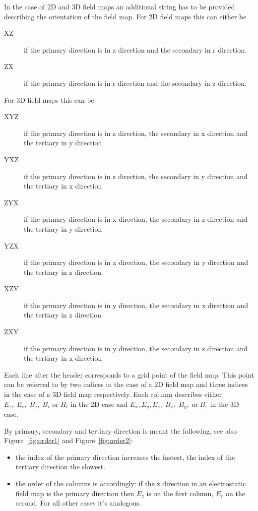 In the case of 2D and 3D field maps an additional string has to be provided describing the orientation of the field map. For 2D field maps this can either be 
\begin{description}
\item[XZ]
if the primary direction is in z direction and the secondary in r direction.
\item[ZX]
if the primary direction is in r direction and the secondary in z direction.
\end{description}
For 3D field maps this can be
\begin{description}
\item[XYZ]
if the primary direction is in z direction, the secondary in x direction and the tertiary in y direction
\item[YXZ]
if the primary direction is in z direction, the secondary in y direction and the tertiary in x direction
\item[ZYX]
if the primary direction is in x direction, the secondary in z direction and the tertiary in y direction
\item[YZX]
if the primary direction is in x direction, the secondary in y direction and the tertiary in z direction
\item[XZY]
if the primary direction is in y direction, the secondary in x direction and the tertiary in z direction
\item[ZXY]
if the primary direction is in y direction, the secondary in z direction and the tertiary in x direction
\end{description}

Each line after the header corresponds to a grid point of the field map. This point can be referred to by two indices in the case of a 2D field map and three indices in the case of a 3D field map respectively. Each column describes either $E_z,\; E_r,\; B_z,\; B_r\; \text{or}\;H_t$ in the 2D case and $E_x, E_y, E_z,\; B_x,\; B_y,\;\text{or}\; B_z$ in the 3D case.

By primary, secondary and tertiary direction is meant the following, see also Figure~\ref{fig:order1} and Figure~\ref{fig:order2}:
\begin{itemize}
\item
the index of the primary direction increases the fastest, the index of the tertiary direction the slowest. 
\item
the order of the columns is accordingly: if the z direction in an electrostatic field map is the primary direction then $E_z$ is on the first column, $E_r$ on the second. For all other cases it's analogous.
\end{itemize}

